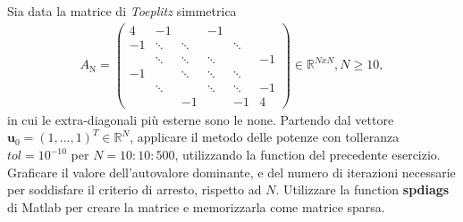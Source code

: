 Sia data la matrice di \textit{Toeplitz} simmetrica
\begin{equation}
     \label{eq:toeplitz}
     \begin{gathered}
          A_\mathrm{N}=\begin{pmatrix}
          4  & -1     &        & -1     &        &    \\
          -1 & \ddots & \ddots &        & \ddots &    \\
             & \ddots & \ddots & \ddots &        & -1 \\
          -1 &        & \ddots & \ddots & \ddots &    \\
             & \ddots &        & \ddots & \ddots & -1 \\
             &        & -1     &        & -1     & 4
          \end{pmatrix} \in\mathbb{R}^{NxN}, N\geq10,
     \end{gathered}
\end{equation}
in cui le extra-diagonali più esterne sono le none. Partendo dal vettore $\textbf{u}_\mathrm{0} = (1,...,1)^{T} \in \mathbb{R}^{N} $, applicare il metodo delle potenze con tolleranza $tol = 10^{-10}$ per $N = 10 : 10 : 500$, utilizzando la function del precedente esercizio. Graficare il valore dell'autovalore dominante, e del numero di iterazioni necessarie per soddisfare il criterio di arresto, rispetto ad $N$. Utilizzare la function \textbf{spdiags} di Matlab per creare la matrice e memorizzarla come matrice sparsa.

